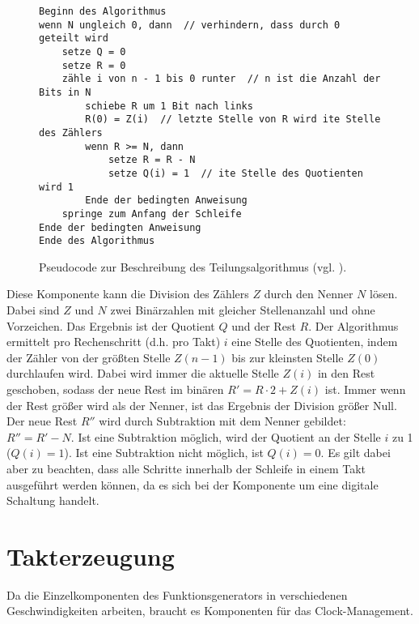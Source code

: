 \begin{figure}[h]
\begin{verbatim}
Beginn des Algorithmus
wenn N ungleich 0, dann  // verhindern, dass durch 0 geteilt wird
    setze Q = 0
    setze R = 0
    zähle i von n - 1 bis 0 runter  // n ist die Anzahl der Bits in N
        schiebe R um 1 Bit nach links
        R(0) = Z(i)  // letzte Stelle von R wird ite Stelle des Zählers
        wenn R >= N, dann               
            setze R = R - N
            setze Q(i) = 1  // ite Stelle des Quotienten wird 1 
        Ende der bedingten Anweisung
    springe zum Anfang der Schleife
Ende der bedingten Anweisung
Ende des Algorithmus
\end{verbatim}
  \caption{Pseudocode zur Beschreibung des Teilungsalgorithmus (vgl. \cite{wikipedia2022}).} \label{Comp:Arith:Division:Pseudo}
\end{figure}

Diese Komponente kann die Division des Zählers $Z$ durch den Nenner $N$ lösen.
Dabei sind $Z$ und $N$ zwei Binärzahlen mit gleicher Stellenanzahl und ohne Vorzeichen.
Das Ergebnis ist der Quotient $Q$ und der Rest $R$.
Der Algorithmus ermittelt pro Rechenschritt (d.h. pro Takt) $i$ eine Stelle des Quotienten, indem der Zähler von der größten Stelle $Z(n-1)$ bis zur kleinsten Stelle $Z(0)$ durchlaufen wird.
Dabei wird immer die aktuelle Stelle $Z(i)$ in den Rest geschoben, sodass der neue Rest im binären $R' = R \cdot 2 + Z(i)$ ist.
Immer wenn der Rest größer wird als der Nenner, ist das Ergebnis der Division größer Null.
Der neue Rest $R''$ wird durch Subtraktion mit dem Nenner gebildet: $R'' = R' - N$.
Ist eine Subtraktion möglich, wird der Quotient an der Stelle $i$ zu 1 ($Q(i)=1$).
Ist eine Subtraktion nicht möglich, ist $Q(i)=0$.
Es gilt dabei aber zu beachten, dass alle Schritte innerhalb der Schleife in einem Takt ausgeführt werden können, da es sich bei der Komponente um eine digitale Schaltung handelt.

\section{Takterzeugung}
Da die Einzelkomponenten des Funktionsgenerators in verschiedenen Geschwindigkeiten arbeiten, braucht es Komponenten für das Clock-Management. 

